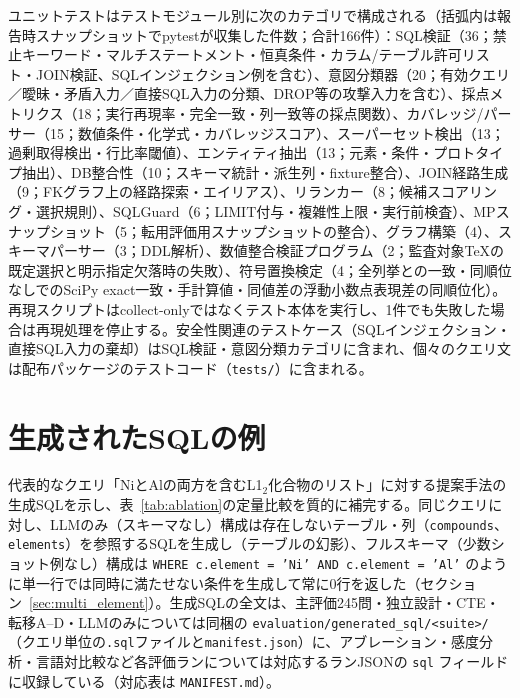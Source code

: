 \documentclass[twocolumn]{interact}
\begin{document}
\label{sec:sup_test_categories}

ユニットテストはテストモジュール別に次のカテゴリで構成される（括弧内は報告時スナップショットでpytestが収集した件数；合計166件）：SQL検証（36；禁止キーワード・マルチステートメント・恒真条件・カラム/テーブル許可リスト・JOIN検証、SQLインジェクション例を含む）、意図分類器（20；有効クエリ／曖昧・矛盾入力／直接SQL入力の分類、DROP等の攻撃入力を含む）、採点メトリクス（18；実行再現率・完全一致・列一致等の採点関数）、カバレッジ/パーサー（15；数値条件・化学式・カバレッジスコア）、スーパーセット検出（13；過剰取得検出・行比率閾値）、エンティティ抽出（13；元素・条件・プロトタイプ抽出）、DB整合性（10；スキーマ統計・派生列・fixture整合）、JOIN経路生成（9；FKグラフ上の経路探索・エイリアス）、リランカー（8；候補スコアリング・選択規則）、SQLGuard（6；LIMIT付与・複雑性上限・実行前検査）、MPスナップショット（5；転用評価用スナップショットの整合）、グラフ構築（4）、スキーマパーサー（3；DDL解析）、数値整合検証プログラム（2；監査対象TeXの既定選択と明示指定欠落時の失敗）、符号置換検定（4；全列挙との一致・同順位なしでのSciPy exact一致・手計算値・同値差の浮動小数点表現差の同順位化）。再現スクリプトはcollect-onlyではなくテスト本体を実行し、1件でも失敗した場合は再現処理を停止する。安全性関連のテストケース（SQLインジェクション・直接SQL入力の棄却）はSQL検証・意図分類カテゴリに含まれ、個々のクエリ文は配布パッケージのテストコード（\texttt{tests/}）に含まれる。


\section{生成されたSQLの例}
\label{sec:sup_sql_examples}

代表的なクエリ「NiとAlの両方を含むL1$_2$化合物のリスト」に対する提案手法の生成SQLを示し、表~\ref{tab:ablation}の定量比較を質的に補完する。同じクエリに対し、LLMのみ（スキーマなし）構成は存在しないテーブル・列（\texttt{compounds}、\texttt{elements}）を参照するSQLを生成し（テーブルの幻影）、フルスキーマ（少数ショット例なし）構成は \texttt{WHERE c.element = 'Ni' AND c.element = 'Al'} のように単一行では同時に満たせない条件を生成して常に0行を返した（セクション~\ref{sec:multi_element}）。生成SQLの全文は、主評価245問・独立設計・CTE・転移A--D・LLMのみについては同梱の \texttt{evaluation/generated\_sql/<suite>/}（クエリ単位の\texttt{.sql}ファイルと\texttt{manifest.json}）に、アブレーション・感度分析・言語対比較など各評価ランについては対応するランJSONの \texttt{sql} フィールドに収録している（対応表は \texttt{MANIFEST.md}）。
\end{document}
